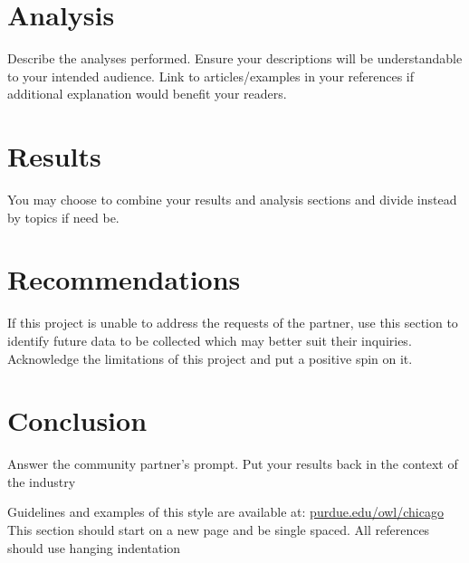 \documentclass{template}
\begin{document}
\section*{Analysis}
Describe the analyses performed. Ensure your descriptions will be understandable to your intended audience. Link to articles/examples in your references if additional explanation would benefit your readers. 

\section*{Results}
You may choose to combine your results and analysis sections and divide instead by topics if need be.

\section*{Recommendations}
If this project is unable to address the requests of the partner, use this section to identify future data to be collected which may better suit their inquiries. Acknowledge the limitations of this project and put a positive spin on it.

\section*{Conclusion}
Answer the community partner’s prompt. Put your results back in the context of the industry
\autocite{Ex95}

\newpage
\begin{singlespace}
\printbibliography

Guidelines and examples of this style are available at: \href{https://owl.purdue.edu/owl/research_and_citation/chicago_manual_17th_edition/cmos_formatting_and_style_guide/general_format.html}{\uline{\textcolor[HTML]{1155CC}{purdue.edu/owl/chicago}}} This section should start on a new page and be single spaced. All references should use hanging indentation 

\end{singlespace}
\end{document}

